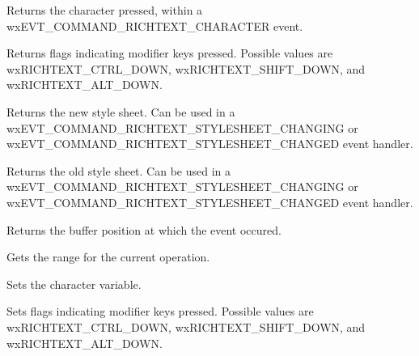 
Returns the character pressed, within a wxEVT\_COMMAND\_RICHTEXT\_CHARACTER event.

\label{wxrichtexteventgetflags}


Returns flags indicating modifier keys pressed. Possible values are wxRICHTEXT\_CTRL\_DOWN,
wxRICHTEXT\_SHIFT\_DOWN, and wxRICHTEXT\_ALT\_DOWN.

\label{wxrichtexteventgetnewstylesheet}


Returns the new style sheet. Can be used in a wxEVT\_COMMAND\_RICHTEXT\_STYLESHEET\_CHANGING or
wxEVT\_COMMAND\_RICHTEXT\_STYLESHEET\_CHANGED event handler.

\label{wxrichtexteventgetoldstylesheet}


Returns the old style sheet. Can be used in a wxEVT\_COMMAND\_RICHTEXT\_STYLESHEET\_CHANGING or
wxEVT\_COMMAND\_RICHTEXT\_STYLESHEET\_CHANGED event handler.

\label{wxrichtexteventgetposition}


Returns the buffer position at which the event occured.

\label{wxrichtexteventgetrange}


Gets the range for the current operation.

\label{wxrichtexteventsetcharacter}


Sets the character variable.

\label{wxrichtexteventsetflags}


Sets flags indicating modifier keys pressed. Possible values are wxRICHTEXT\_CTRL\_DOWN,
wxRICHTEXT\_SHIFT\_DOWN, and wxRICHTEXT\_ALT\_DOWN.

